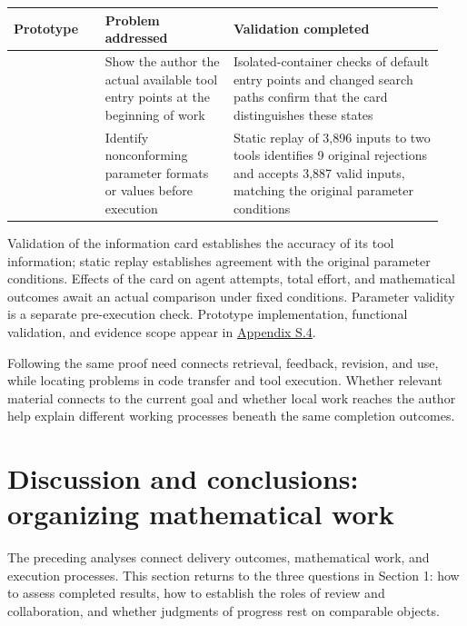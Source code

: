 \begingroup\small\setlength{\tabcolsep}{3pt}\renewcommand{\arraystretch}{1.14}
\par\nopagebreak\medskip\noindent\begin{minipage}[t]{\linewidth}
\begin{tabular}{>{\raggedright\arraybackslash}p{0.2\linewidth}>{\raggedright\arraybackslash}p{0.28\linewidth}>{\raggedright\arraybackslash}p{0.46\linewidth}}
\toprule
\textbf{Prototype} & \textbf{Problem addressed} & \textbf{Validation completed}\\\midrule

{Startup tool-information card} & {Show the author the actual available tool entry points at the beginning of work} & {Isolated-container checks of default entry points and changed search paths confirm that the card distinguishes these states}\\
{Parameter preflight} & {Identify nonconforming parameter formats or values before execution} & {Static replay of 3,896 inputs to two tools identifies 9 original rejections and accepts 3,887 valid inputs, matching the original parameter conditions}\\
\bottomrule\end{tabular}\end{minipage}\par\medskip\endgroup
Validation of the information card establishes the accuracy of its tool information; static replay establishes agreement with the original parameter conditions. Effects of the card on agent attempts, total effort, and mathematical outcomes await an actual comparison under fixed conditions. Parameter validity is a separate pre-execution check. Prototype implementation, functional validation, and evidence scope appear in \href{en-appendix.pdf\#s4}{Appendix S.4}.

Following the same proof need connects retrieval, feedback, revision, and use, while locating problems in code transfer and tool execution. Whether relevant material connects to the current goal and whether local work reaches the author help explain different working processes beneath the same completion outcomes.

\section[Discussion and conclusions: organizing mathematical work]{\texorpdfstring{\protect\hypertarget{section-6}{}Discussion and conclusions: organizing mathematical work}{Discussion and conclusions: organizing mathematical work}}
The preceding analyses connect delivery outcomes, mathematical work, and execution processes. This section returns to the three questions in Section 1: how to assess completed results, how to establish the roles of review and collaboration, and whether judgments of progress rest on comparable objects.

